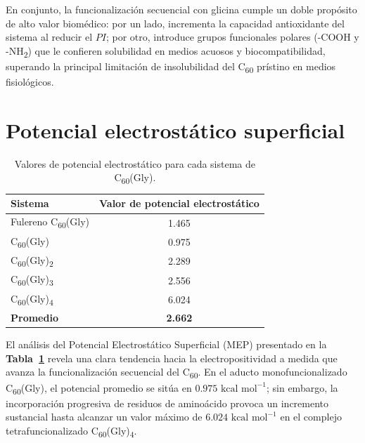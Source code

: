 En conjunto, la funcionalización secuencial con glicina cumple un doble propósito de alto valor biomédico: por un lado, incrementa la capacidad antioxidante del sistema al reducir el $PI$; por otro, introduce grupos funcionales polares (-COOH y -NH\textsubscript{2}) que le confieren solubilidad en medios acuosos y biocompatibilidad, superando la principal limitación de insolubilidad del C\textsubscript{60} prístino en medios fisiológicos.


    
    \section{Potencial electrostático superficial}
     \begin{table}[H]
    \centering
    \caption{Valores de potencial electrostático para cada sistema de C\textsubscript{60}(Gly).}
    \label{tab:potencial-electrostatico}
    \renewcommand{\arraystretch}{1.15}
    \begin{tabular}{lc}
        \toprule
        \textbf{Sistema} & \textbf{Valor de potencial electrostático} \\
        \midrule
        Fulereno C\textsubscript{60}(Gly) & 1.465 \\
       C\textsubscript{60}(Gly) & 0.975 \\
        C\textsubscript{60}(Gly)\textsubscript{2} & 2.289 \\
        C\textsubscript{60}(Gly)\textsubscript{3} & 2.556 \\
        C\textsubscript{60}(Gly)\textsubscript{4} & 6.024 \\
        \midrule
        \textbf{Promedio} & \textbf{2.662} \\
        \bottomrule
        \end{tabular}
\end{table}

El análisis del Potencial Electrostático Superficial (MEP) presentado en la \textbf{Tabla~\ref{tab:potencial-electrostatico}} revela una clara tendencia hacia la electropositividad a medida que avanza la funcionalización secuencial del C\textsubscript{60}. En el aducto monofuncionalizado C\textsubscript{60}(Gly), el potencial promedio se sitúa en $0.975\text{ kcal mol}^{-1}$; sin embargo, la incorporación progresiva de residuos de aminoácido provoca un incremento sustancial hasta alcanzar un valor máximo de $6.024\text{ kcal mol}^{-1}$ en el complejo tetrafuncionalizado C\textsubscript{60}(Gly)\textsubscript{4}. 

